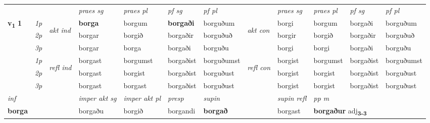
\begin{longtable}[l]{X>{\footnotesize\itshape}llXXXXlXXXX} \toprule
 & &   & \textit{praes sg}  & \textit{praes pl}    & \textit{ pf sg} & \textit{pf pl} & & \textit{praes sg}  & \textit{praes pl}    & \textit{pf sg} & \textit{pf pl }  \\ \cmidrule{4-7} \cmidrule{9-12}
 \multirow{2}{*}{{{\textbf{v{\textsubscript{1}}} \Large{\textbf{1}}}}}  & 1p & \multirow{3}{*}{\begin{turn}{90}\textit{akt ind}\end{turn}} & \textbf{borga} & borgum & \textbf{borgaði} & borguðum & \multirow{3}{*}{\begin{turn}{90}\textit{akt con}\end{turn}} &borgi & borgum & borgaði & borguðum\\*
 & 2p &  &  borgar  & borgið & borgaðir & borguðuð & & borgir & borgið & borgaðir & borguðuð \\*
 & 3p &  & borgar & borga & borgaði & borguðu & & borgi & borgi& borgaði & borguðu \\*
\cmidrule{4-7} \cmidrule{9-12}
 & 1p & \multirow{3}{*}{\begin{turn}{90}\textit{refl ind}\end{turn}}  & borgast & borgumst & borgaðist & borguðumst & \multirow{3}{*}{\begin{turn}{90}\textit{refl con}\end{turn}}  &borgist & borgumst & borgaðist & borguðumst \\*
 & 2p &  & borgast & borgist & borgaðist & borguðust & &borgist & borgist & borgaðist & borguðust \\*
 & 3p  & & borgast & borgast & borgaðist & borguðust & & borgist & borgist& borgaðist & borguðust \\*
\cmidrule{4-7} \cmidrule{9-12}

   {\textit{inf}} & &  & \textit{imper akt sg} & \textit{imper akt pl}   & \textit{presp} & \textit{supin} && \textit{supin refl} & \textit{pp m} \\*
  {\textbf{borga}} & && borgaðu  & borgið   & borgandi &  \textbf{borgað} && borgast & \multicolumn{2}{l}{\textbf{borgaður} adj\textbf{\textsubscript{3-3}}} \\*

\midrule


\end{longtable}
